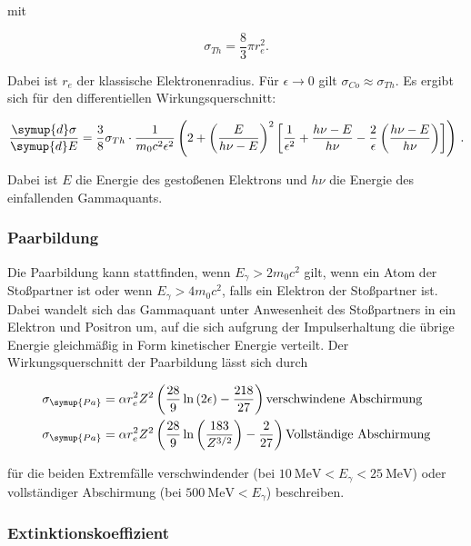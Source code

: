 mit 

\begin{equation*}
    \sigma_{Th} = \frac{8}{3}\pi r_e^2.
\end{equation*}

Dabei ist $r_e$ der klassische Elektronenradius. Für $\epsilon\rightarrow 0$ gilt $\sigma_{Co} \approx \sigma_{Th}$.
Es ergibt sich für den differentiellen Wirkungsquerschnitt:

\begin{equation}
    \label{eqn:klein}
    \frac{\symup{d}\sigma}{\symup{d}E} = \frac{3}{8}\sigma_{Th}\cdot\frac{1}{m_0 c^2 \epsilon^2}\left(2+\left(\frac{E}{h\nu - E}\right)^2\left[\frac{1}{\epsilon^2}+\frac{h\nu-E}{h\nu}-\frac{2}{\epsilon}\left(\frac{h\nu-E}{h\nu}\right)\right]\right)\,.
\end{equation}

Dabei ist $E$ die Energie des gestoßenen Elektrons und $h\nu$ die Energie des einfallenden Gammaquants.

\subsubsection{Paarbildung}

Die Paarbildung kann stattfinden, wenn $E_\gamma>2m_0c^2$ gilt, wenn ein Atom der Stoßpartner ist oder wenn $E_\gamma > 4m_0c^2$, falls 
ein Elektron der Stoßpartner ist. Dabei wandelt sich das Gammaquant unter Anwesenheit des Stoßpartners in ein Elektron und Positron um, 
auf die sich aufgrung der Impulserhaltung die übrige Energie gleichmäßig in Form kinetischer Energie verteilt. Der Wirkungsquerschnitt
der Paarbildung lässt sich durch 

\begin{align*}
    \sigma_{\symup{Pa}} &= \alpha r_e^2 Z^2\left(\frac{28}{9}\ln{\left(2\epsilon\right)}-\frac{218}{27}\right)\textrm{verschwindene Abschirmung}\\
    \sigma_{\symup{Pa}} &= \alpha r_e^2 Z^2\left(\frac{28}{9}\ln{\left(\frac{183}{Z^{3/2}}\right)}-\frac{2}{27}\right) \textrm{Vollständige Abschirmung}
\end{align*}

für die beiden Extremfälle verschwindender (bei $\SI{10}{\mega\eV}<E_\gamma<\SI{25}{\mega\eV}$) oder vollständiger Abschirmung (bei $\SI{500}{\mega\eV}<E_\gamma$) beschreiben.

\subsubsection*{Extinktionskoeffizient}

